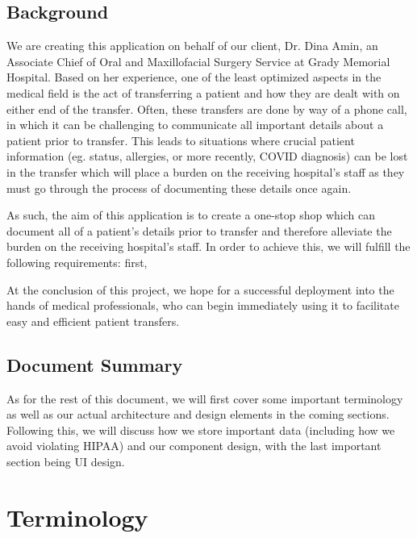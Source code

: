 \documentclass[11pt,letterpaper]{article}
\begin{document}
\subsection{Background}

We are creating this application on behalf of our client, Dr. Dina Amin, an Associate Chief of Oral and Maxillofacial Surgery Service at Grady Memorial Hospital. Based on her experience, one of the least optimized aspects in the medical field is the act of transferring a patient and how they are dealt with on either end of the transfer. Often, these transfers are done by way of a phone call, in which it can be challenging to communicate all important details about a patient prior to transfer. This leads to situations where crucial patient information (eg. status, allergies, or more recently, COVID diagnosis) can be lost in the transfer which will place a burden on the receiving hospital's staff as they must go through the process of documenting these details once again. 

As such, the aim of this application is to create a one-stop shop which can document all of a patient's details prior to transfer and therefore alleviate the burden on the receiving hospital's staff. In order to achieve this, we will fulfill the following requirements: first, 


At the conclusion of this project, we hope for a successful deployment into the hands of medical professionals, who can begin immediately using it to facilitate easy and efficient patient transfers.
\subsection{Document Summary}
As for the rest of this document, we will first cover some important terminology as well as our actual architecture and design elements in the coming sections. Following this, we will discuss how we store important data (including how we avoid violating HIPAA) and our component design, with the last important section being UI design.
\section{Terminology}
\end{document}

